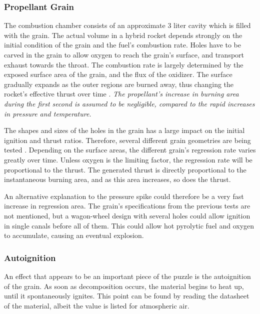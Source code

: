 	\subsubsection{Propellant Grain}
		The combustion chamber consists of an approximate 3 liter cavity which is filled with the grain. The actual volume in a hybrid rocket depends strongly on the initial condition of the grain and the fuel's combustion rate. Holes have to be carved in the grain to allow oxygen to reach the grain's surface, and transport exhaust towards the throat. The combustion rate is largely determined by the exposed surface area of the grain, and the flux of the oxidizer. The surface gradually expands as the outer regions are burned away, thus changing the rocket's effective thrust over time \cite[chapter 12, p.~174]{ignition}. \emph{The propellant's increase in burning area during the first second is assumed to be negligible, compared to the rapid increases in pressure and temperature.}

		The shapes and sizes of the holes in the grain has a large impact on the initial ignition and thrust ratios. \cite{nakka} Therefore, several different grain geometries are being tested . Depending on the surface areas, the different grain's regression rate varies greatly over time. Unless oxygen is the limiting factor, the regression rate will be proportional to the thrust. The generated thrust is directly proportional to the instantaneous burning area, and as this area increases, so does the thrust.

		An alternative explanation to the pressure spike could therefore be a very fast increase in regression area. The grain's specifications from the previous tests are not mentioned, but a wagon-wheel design with several holes could allow ignition in single canals before all of them. This could allow hot pyrolytic fuel and oxygen to accumulate, causing an eventual explosion.

	\subsubsection{Autoignition}



		An effect that appears to be an important piece of the puzzle is the autoignition of the grain. As soon as decomposition occurs, the material begins to heat up, until it spontaneously ignites. This point can be found by reading the datasheet of the material, albeit the value is listed for atmospheric air. \cite{principlesoffire}

